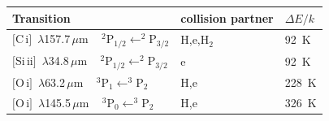\begin{frame}
\begin{center}
\begin{tabular} {lll}
Transition   &    collision partner &  $\Delta E / k$ \\   \hline 
$[$C\,{\sc i}$]$~$\lambda$157.7\,$\mu$m ~ $\mathrm{^2P_{1/2} \leftarrow ^2P_{3/2} } $    & H,e,H$_2$  &   92~K \\
$[$Si\,{\sc ii}$]$~$\lambda$34.8\,$\mu$m ~ $\mathrm{^2P_{1/2} \leftarrow ^2P_{3/2} } $    & e  &   92~K \\
$[$O\,{\sc i}$]$~$\lambda$63.2\,$\mu$m ~ $\mathrm{^3P_{1} \leftarrow ^3P_{2} } $    & H,e  &   228~K \\
$[$O\,{\sc i}$]$~$\lambda$145.5\,$\mu$m ~ $\mathrm{^3P_{0} \leftarrow ^3P_{2} } $    & H,e  &   326~K \\
\end{tabular}
\end{center}




\end{frame} 

%

